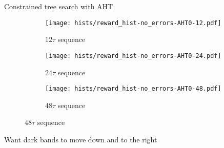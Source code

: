 \documentclass{beamer}
\begin{document}
\begin{frame}{Constrained tree search with AHT}
%
\begin{figure}[H]
    \centering
    \begin{subfigure}{.49\textwidth}
        \centering
        \texttt{[image: hists/reward\_hist-no\_errors-AHT0-12.pdf]}
        \caption{$12\tau$ sequence}
        \label{fig:reward_hist-no_errors-AHT0-12}
    \end{subfigure}
    \begin{subfigure}{.49\textwidth}
        \centering
        \texttt{[image: hists/reward\_hist-no\_errors-AHT0-24.pdf]}
        \caption{$24\tau$ sequence}
        \label{fig:reward_hist-no_errors-AHT0-24}
    \end{subfigure}
    \begin{subfigure}{.49\textwidth}
        \centering
        \texttt{[image: hists/reward\_hist-no\_errors-AHT0-48.pdf]}
        \caption{$48\tau$ sequence}
        \label{fig:reward_hist-no_errors-AHT0-48}
    \end{subfigure}
\end{figure}

Want dark bands to move down and to the right


\end{frame}
\end{document}
